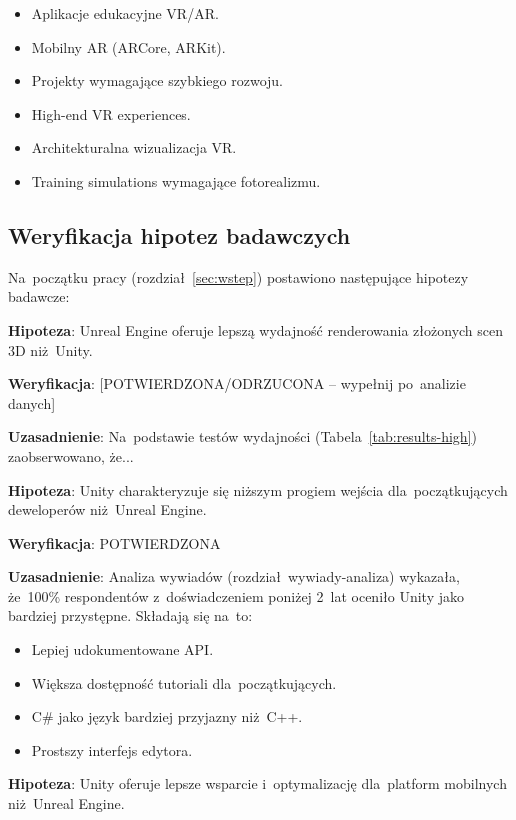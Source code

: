 \begin{itemize}
    \item Aplikacje edukacyjne VR/AR.
    \item Mobilny AR (ARCore, ARKit).
    \item Projekty wymagające szybkiego rozwoju.
\end{itemize}

\begin{itemize}
    \item High-end VR experiences.
    \item Architekturalna wizualizacja VR.
    \item Training simulations wymagające fotorealizmu.
\end{itemize}

\subsection{Weryfikacja hipotez badawczych}

Na~początku pracy (rozdział~\ref{sec:wstep}) postawiono następujące hipotezy badawcze:


\textbf{Hipoteza}: Unreal Engine oferuje lepszą wydajność renderowania złożonych scen 3D niż~Unity.

\textbf{Weryfikacja}: [POTWIERDZONA/ODRZUCONA -- wypełnij po~analizie danych]

\textbf{Uzasadnienie}: Na~podstawie testów wydajności (Tabela~\ref{tab:results-high}) zaobserwowano, że...


\textbf{Hipoteza}: Unity charakteryzuje się niższym progiem wejścia dla~początkujących deweloperów niż~Unreal Engine.

\textbf{Weryfikacja}: POTWIERDZONA

\textbf{Uzasadnienie}: Analiza wywiadów (rozdział~wywiady-analiza) wykazała, że~100\% respondentów z~doświadczeniem poniżej 2~lat oceniło Unity jako bardziej przystępne. Składają się na~to:
\begin{itemize}
    \item Lepiej udokumentowane API.
    \item Większa dostępność tutoriali dla~początkujących.
    \item C\# jako język bardziej przyjazny niż~C++.
    \item Prostszy interfejs edytora.
\end{itemize}


\textbf{Hipoteza}: Unity oferuje lepsze wsparcie i~optymalizację dla~platform mobilnych niż~Unreal Engine.

